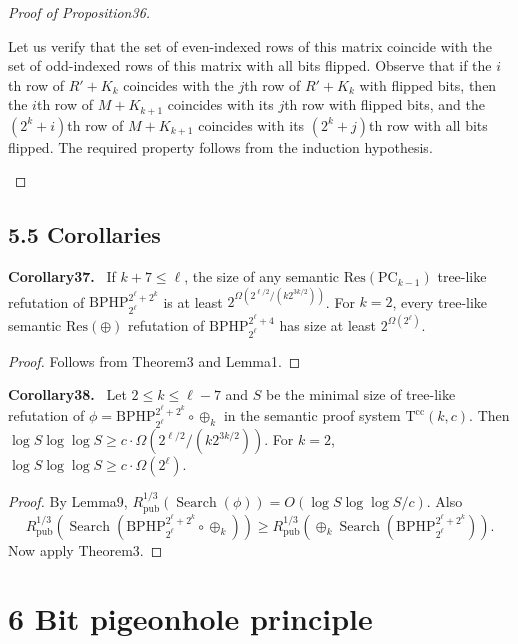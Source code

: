 \documentclass[10pt,a4paper]{article}
\newenvironment{authorclaim}[1]{\par\medskip\noindent\textbf{#1.}\ \ignorespaces}{\par\medskip}
\begin{document}
\begin{proof}[Proof of Proposition36]
\begin{enumerate}
Let us verify that the set of even-indexed rows of this matrix coincide with the set of odd-indexed rows of this matrix with all bits flipped. Observe that if the $i$th row of $R'+K_k$ coincides with the $j$th row of $R'+K_k$ with flipped bits, then the $i$th row of $M+K_{k+1}$ coincides with its $j$th row with flipped bits, and the $(2^k+i)$th row of $M+K_{k+1}$ coincides with its $(2^k+j)$th row with all bits flipped. The required property follows from the induction hypothesis.
\end{enumerate}
\end{proof}
\subsection*{5.5 Corollaries}
\begin{authorclaim}{Corollary37}
If $k+7\le\ell$, the size of any semantic $\mathrm{Res}(\mathrm{PC}_{k-1})$ tree-like refutation of $\mathrm{BPHP}_{2^\ell}^{2^\ell+2^k}$ is at least $2^{\Omega(2^{\ell/2}/(k2^{3k/2}))}$. For $k=2$, every tree-like semantic $\mathrm{Res}(\oplus)$ refutation of $\mathrm{BPHP}_{2^\ell}^{2^\ell+4}$ has size at least $2^{\Omega(2^\ell)}$.
\end{authorclaim}
\begin{proof}
Follows from Theorem3 and Lemma1.
\end{proof}
\begin{authorclaim}{Corollary38}
Let $2\le k\le\ell-7$ and $S$ be the minimal size of tree-like refutation of $\phi=\mathrm{BPHP}_{2^\ell}^{2^\ell+2^k}\circ\oplus_k$ in the semantic proof system $\mathrm T^{\mathrm{cc}}(k,c)$. Then
$\log S\log\log S\ge c\cdot\Omega(2^{\ell/2}/(k2^{3k/2}))$.
For $k=2$, $\log S\log\log S\ge c\cdot\Omega(2^\ell)$.
\end{authorclaim}
\begin{proof}
By Lemma9, $R^{1/3}_{\mathrm{pub}}(\operatorname{Search}(\phi))=O(\log S\log\log S/c)$. Also
\[
R^{1/3}_{\mathrm{pub}}(\operatorname{Search}(\mathrm{BPHP}_{2^\ell}^{2^\ell+2^k}\circ\oplus_k))
\ge R^{1/3}_{\mathrm{pub}}(\oplus_k\operatorname{Search}(\mathrm{BPHP}_{2^\ell}^{2^\ell+2^k})).
\]
Now apply Theorem3.
\end{proof}

\section*{6 Bit pigeonhole principle}
\end{document}
